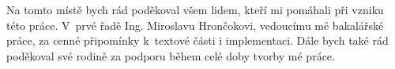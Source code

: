 Na tomto místě bych rád poděkoval všem lidem, kteří mi pomáhali při vzniku této práce. V~prvé řadě Ing. Miroslavu Hrončokovi, vedoucímu mé bakalářské práce, za cenné připomínky k~textové části i implementaci. Dále bych také rád poděkoval své rodině za podporu během celé doby tvorby mé práce.